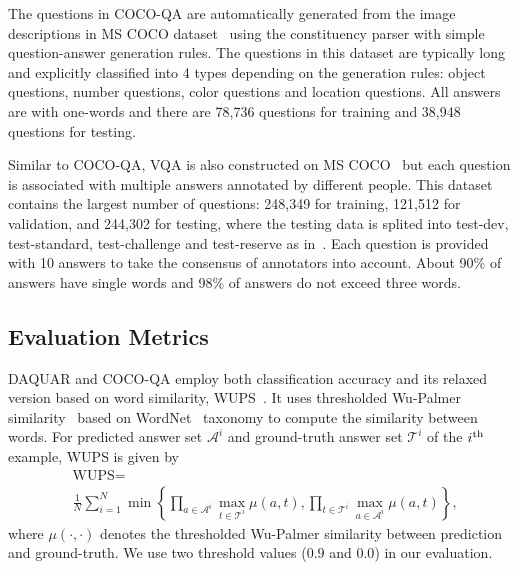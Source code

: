 \documentclass[10pt,twocolumn,letterpaper]{article}
\begin{document}
The questions in COCO-QA are automatically generated from the image descriptions in MS COCO dataset~\cite{Mscoco} using the constituency parser with simple question-answer generation rules.
The questions in this dataset are typically long and explicitly classified into 4 types depending on the generation rules: object questions, number questions, color questions and location questions.
All answers are with one-words and there are 78,736 questions for training and 38,948 questions for testing.

Similar to COCO-QA, VQA is also constructed on MS COCO~\cite{Mscoco} but each question is associated with multiple answers annotated by different people. 
This dataset contains the largest number of questions: 248,349 for training, 121,512 for validation, and 244,302 for testing, where the testing data is splited into test-dev, test-standard, test-challenge and test-reserve as in~\cite{Mscoco}.
Each question is provided with 10 answers to take the consensus of annotators into account.
About 90\% of answers have single words and 98\% of answers do not exceed three words.


\subsection{Evaluation Metrics}


DAQUAR and COCO-QA employ both classification accuracy and its relaxed version based on word similarity, WUPS~\cite{Multiworld}.
It uses thresholded Wu-Palmer similarity~\cite{wu1994verbs} based on WordNet~\cite{fellbaum1998wordnet} taxonomy to compute the similarity between words.
For predicted answer set $\mathcal{A}^{i}$ and ground-truth answer set $\mathcal{T}^{i}$ of the $i^{\rm th}$ example, WUPS is given by
\begin{align}
&{\text{WUPS}} = \nonumber \\ 
&\frac { 1 }{ N } \sum _{ i=1 }^{ N }{ \min { \left\{ \prod _{ a\in \mathcal{A}^{ i } }^{  }{ \max _{ t\in \mathcal{T}^{ i } }{ \mu \left( a,t \right)  }  } , \prod _{ t\in \mathcal{T}^{ i } }^{  }{ \max _{ a\in \mathcal{A}^i }{ \mu \left( a,t \right)  }  }  \right\}  }  } , 
\end{align}
where $\mu \left(\cdot, \cdot \right)$ denotes the thresholded Wu-Palmer similarity between prediction and ground-truth.
We use two threshold values ($0.9$ and $0.0$) in our evaluation.
\end{document}
